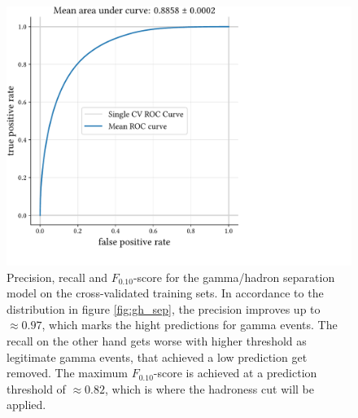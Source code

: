 \begin{figure}
    \centering
    \captionsetup{width=0.9\linewidth}
    \includegraphics[page=3, width=.9\textwidth]{../analysis/plots/cross_val_sep_perf_plot.pdf}
    \caption{Precision, recall and $F_{\num{0.10}}$-score for the gamma/hadron separation model on the 
    cross-validated training sets.
    In accordance to the distribution in figure \ref{fig:gh_sep}, the precision improves up
    to $\approx \num{0.97}$, which marks the hight predictions for gamma events.
    The recall on the other hand gets worse with higher threshold as legitimate gamma events,
    that achieved a low prediction get removed. 
    The maximum $F_{\num{0.10}}$-score is achieved at a prediction threshold
    of $\approx \num{0.82}$, which is where the hadroness cut will be applied.}
    \label{fig:gh_fscore}
\end{figure}


